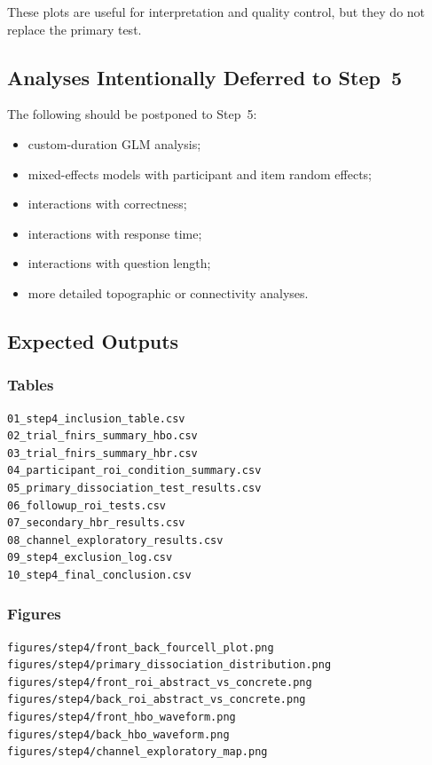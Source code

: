\documentclass[11pt]{article}
\begin{document}
These plots are useful for interpretation and quality control, but they do not replace the primary test.

\subsection{Analyses Intentionally Deferred to Step~5}
The following should be postponed to Step~5:
\begin{itemize}
    \item custom-duration GLM analysis;
    \item mixed-effects models with participant and item random effects;
    \item interactions with correctness;
    \item interactions with response time;
    \item interactions with question length;
    \item more detailed topographic or connectivity analyses.
\end{itemize}

\subsection{Expected Outputs}

\subsubsection*{Tables}
\begin{verbatim}
01_step4_inclusion_table.csv
02_trial_fnirs_summary_hbo.csv
03_trial_fnirs_summary_hbr.csv
04_participant_roi_condition_summary.csv
05_primary_dissociation_test_results.csv
06_followup_roi_tests.csv
07_secondary_hbr_results.csv
08_channel_exploratory_results.csv
09_step4_exclusion_log.csv
10_step4_final_conclusion.csv
\end{verbatim}

\subsubsection*{Figures}
\begin{verbatim}
figures/step4/front_back_fourcell_plot.png
figures/step4/primary_dissociation_distribution.png
figures/step4/front_roi_abstract_vs_concrete.png
figures/step4/back_roi_abstract_vs_concrete.png
figures/step4/front_hbo_waveform.png
figures/step4/back_hbo_waveform.png
figures/step4/channel_exploratory_map.png
\end{verbatim}
\end{document}
